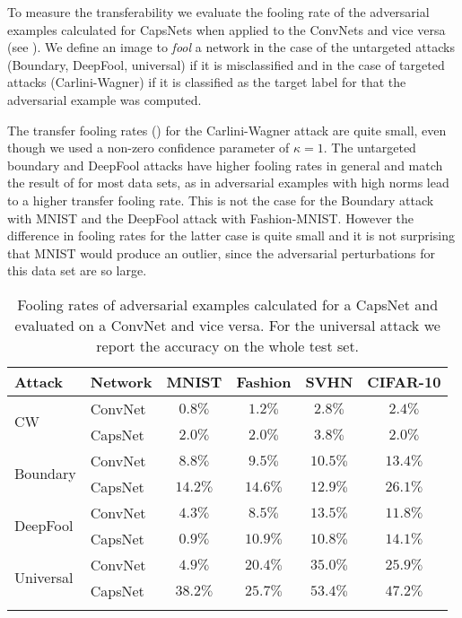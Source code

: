 To measure the transferability we evaluate the fooling rate of the adversarial examples calculated for CapsNets when applied to the ConvNets and vice versa (see ). We define an image to \emph{fool} a network in the case of the untargeted attacks (Boundary, DeepFool, universal) if it is misclassified and in the case of targeted attacks (Carlini-Wagner) if it is classified as the target label for that the adversarial example was computed.

The transfer fooling rates () for the Carlini-Wagner attack are quite small, even though we used a non-zero confidence parameter of $\kappa=1$.
The untargeted boundary and DeepFool attacks have higher fooling rates in general and match the result of  for most data sets, as in adversarial examples with high norms lead to a higher transfer fooling rate.
This is not the case for the Boundary attack with MNIST and the DeepFool attack with Fashion-MNIST. However the difference in fooling rates for the latter case is quite small and it is not surprising that MNIST would produce an outlier, since the adversarial perturbations for this data set are so large.

\begin{table}
	\centering
	\begin{tabular}{llcccc}
		\toprule
		Attack & Network       & MNIST & Fashion & SVHN & CIFAR-10  \\
		\midrule
		\multirow{2}{*}{CW} & ConvNet & $0.8\%$ & $1.2\%$ & $2.8\%$ & $2.4\%$ \\
		& CapsNet            & $2.0\%$ & $2.0\%$ & $3.8\%$ & $2.0\%$ \\
		\midrule
		\multirow{2}{*}{Boundary} & ConvNet & $8.8\%$ & $9.5\%$ & $10.5\%$ & $13.4\%$ \\
		& CapsNet            & $14.2\%$ & $14.6\%$ & $12.9\%$ & $26.1\%$ \\
		\midrule
		\multirow{2}{*}{DeepFool} & ConvNet & $4.3\%$ & $8.5\%$ & $13.5\%$ & $11.8\%$ \\
		& CapsNet           & $0.9\%$ & $10.9\%$ & $10.8\%$ & $14.1\%$ \\
		\midrule
		\multirow{2}{*}{Universal} & ConvNet & $4.9\%$ & $20.4\%$ & $35.0\%$ & $25.9\%$ \\
		& CapsNet           & $38.2\%$ & $25.7\%$ & $53.4\%$ & $47.2\%$ \\
		\bottomrule\\
	\end{tabular}
	\caption[Transfer fooling rates]{Fooling rates of adversarial examples calculated for a CapsNet and evaluated on a ConvNet and vice versa. For the universal attack we report the accuracy on the whole test set.}
	\label{tab:transfer}
\end{table}

